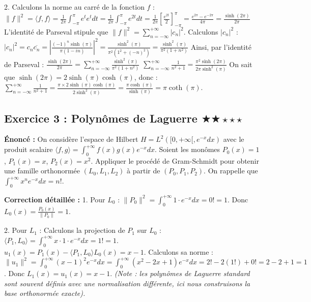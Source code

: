 \documentclass[11pt,a4paper]{article}
\begin{document}
2. Calculons la norme au carré de la fonction $f$ :
   $\|f\|^2 = \langle f, f \rangle = \frac{1}{2\pi} \int_{-\pi}^\pi e^t e^t dt = \frac{1}{2\pi} \int_{-\pi}^\pi e^{2t} dt = \frac{1}{2\pi} \left[ \frac{e^{2t}}{2} \right]_{-\pi}^\pi = \frac{e^{2\pi} - e^{-2\pi}}{4\pi} = \frac{\sinh(2\pi)}{2\pi}$
   L'identité de Parseval stipule que $\|f\|^2 = \sum_{n=-\infty}^{+\infty} |c_n|^2$.
   Calculons $|c_n|^2$ :
   $|c_n|^2 = c_n \overline{c_n} = \left| \frac{(-1)^n \sinh(\pi)}{\pi(1-in)} \right|^2 = \frac{\sinh^2(\pi)}{\pi^2 (1^2 + (-n)^2)} = \frac{\sinh^2(\pi)}{\pi^2 (1+n^2)}$
   Ainsi, par l'identité de Parseval :
   $\frac{\sinh(2\pi)}{2\pi} = \sum_{n=-\infty}^{+\infty} \frac{\sinh^2(\pi)}{\pi^2 (1+n^2)}$
   $\sum_{n=-\infty}^{+\infty} \frac{1}{n^2 + 1} = \frac{\pi^2 \sinh(2\pi)}{2\pi \sinh^2(\pi)}$
   On sait que $\sinh(2\pi) = 2\sinh(\pi)\cosh(\pi)$, donc :
   $\sum_{n=-\infty}^{+\infty} \frac{1}{n^2 + 1} = \frac{\pi \times 2\sinh(\pi)\cosh(\pi)}{2 \sinh^2(\pi)} = \frac{\pi \cosh(\pi)}{\sinh(\pi)} = \pi \coth(\pi)$.


\subsection*{Exercice 3 : Polynômes de Laguerre $\bigstar\bigstar\star\star\star$}

\textbf{Énoncé :}
On considère l'espace de Hilbert $H = L^2([0, +\infty[, e^{-x}dx)$ avec le produit scalaire $\langle f, g \rangle = \int_0^{+\infty} f(x)g(x)e^{-x} dx$.
Soient les monômes $P_0(x) = 1$, $P_1(x) = x$, $P_2(x) = x^2$.
Appliquer le procédé de Gram-Schmidt pour obtenir une famille orthonormée $(L_0, L_1, L_2)$ à partir de $(P_0, P_1, P_2)$.
On rappelle que $\int_0^{+\infty} x^n e^{-x} dx = n!$.

\textbf{Correction détaillée :}
1. Pour $L_0$ :
   $\|P_0\|^2 = \int_0^{+\infty} 1 \cdot e^{-x} dx = 0! = 1$.
   Donc $L_0(x) = \frac{P_0(x)}{\|P_0\|} = 1$.

2. Pour $L_1$ :
   Calculons la projection de $P_1$ sur $L_0$ :
   $\langle P_1, L_0 \rangle = \int_0^{+\infty} x \cdot 1 \cdot e^{-x} dx = 1! = 1$.
   $u_1(x) = P_1(x) - \langle P_1, L_0 \rangle L_0(x) = x - 1$.
   Calculons sa norme :
   $\|u_1\|^2 = \int_0^{+\infty} (x-1)^2 e^{-x} dx = \int_0^{+\infty} (x^2 - 2x + 1) e^{-x} dx = 2! - 2(1!) + 0! = 2 - 2 + 1 = 1$.
   Donc $L_1(x) = u_1(x) = x - 1$.
   \textit{(Note : les polynômes de Laguerre standard sont souvent définis avec une normalisation différente, ici nous construisons la base orthonormée exacte).}
\end{document}
